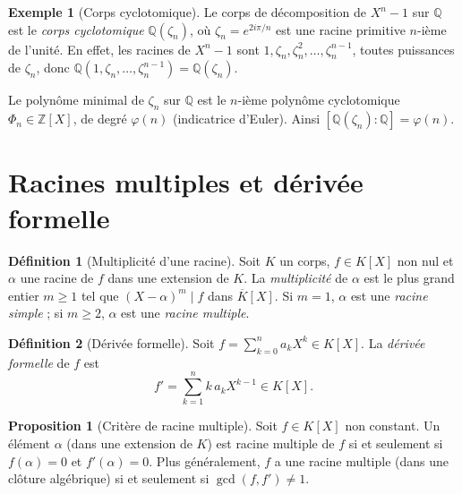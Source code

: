 \documentclass[12pt,a4paper,openany]{book}
\theoremstyle{definition}
\newtheorem{definition}{Définition}[chapter]
\newtheorem{proposition}{Proposition}[chapter]
\newtheorem{exemple}{Exemple}[chapter]
\newcommand{\Z}{\mathbb{Z}}
\newcommand{\Q}{\mathbb{Q}}
\begin{document}
\begin{exemple}[Corps cyclotomique]\label{ex:corps-cyclotomique}
Le corps de décomposition de $X^n - 1$ sur $\Q$ est le \emph{corps cyclotomique}
$\Q(\zeta_n)$, où $\zeta_n = e^{2i\pi/n}$ est une racine primitive $n$-ième de
l'unité. En effet, les racines de $X^n - 1$ sont $1, \zeta_n, \zeta_n^2, \dots,
\zeta_n^{n-1}$, toutes puissances de $\zeta_n$, donc
$\Q(1, \zeta_n, \dots, \zeta_n^{n-1}) = \Q(\zeta_n)$.

Le polynôme minimal de $\zeta_n$ sur $\Q$ est le $n$-ième polynôme cyclotomique
$\Phi_n \in \Z[X]$, de degré $\varphi(n)$ (indicatrice d'Euler). Ainsi
$[\Q(\zeta_n):\Q] = \varphi(n)$.
\end{exemple}

\section{Racines multiples et dérivée formelle}
\label{sec:racines-multiples}

\begin{definition}[Multiplicité d'une racine]\label{def:multiplicite}
Soit $K$ un corps, $f \in K[X]$ non nul et $\alpha$ une racine de $f$ dans une
extension de $K$. La \emph{multiplicité} de $\alpha$ est le plus grand entier
$m \geq 1$ tel que $(X - \alpha)^m \mid f$ dans $\overline{K}[X]$. Si $m = 1$,
$\alpha$ est une \emph{racine simple} ; si $m \geq 2$,
$\alpha$ est une \emph{racine multiple}.
\end{definition}

\begin{definition}[Dérivée formelle]\label{def:derivee-formelle}
Soit $f = \sum_{k=0}^n a_k X^k \in K[X]$. La \emph{dérivée formelle} de $f$ est
\[
  f' = \sum_{k=1}^{n} k\, a_k X^{k-1} \in K[X].
\]
\end{definition}

\begin{proposition}[Critère de racine multiple]\label{prop:critere-racine-multiple}
Soit $f \in K[X]$ non constant. Un élément $\alpha$ (dans une extension de $K$)
est racine multiple de $f$ si et seulement si $f(\alpha) = 0$ et $f'(\alpha) = 0$.
Plus généralement, $f$ a une racine multiple (dans une clôture algébrique) si et
seulement si $\gcd(f, f') \neq 1$.
\end{proposition}
\end{document}
